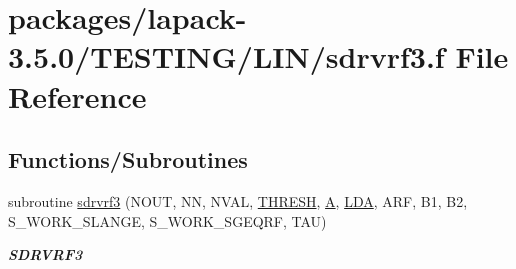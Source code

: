 \hypertarget{sdrvrf3_8f}{}\section{packages/lapack-\/3.5.0/\+T\+E\+S\+T\+I\+N\+G/\+L\+I\+N/sdrvrf3.f File Reference}
\label{sdrvrf3_8f}
\subsection*{Functions/\+Subroutines}
\begin{DoxyCompactItemize}
\item 
subroutine \hyperlink{group__single__lin_ga9a8604f18892afb24a856de008ea378f}{sdrvrf3} (N\+O\+U\+T, N\+N, N\+V\+A\+L, \hyperlink{zlaqgs_8c_a0656018abfc9fa2821827415f5d5ea57}{T\+H\+R\+E\+S\+H}, \hyperlink{classA}{A}, \hyperlink{example__user_8c_ae946da542ce0db94dced19b2ecefd1aa}{L\+D\+A}, A\+R\+F, B1, B2, S\+\_\+\+W\+O\+R\+K\+\_\+\+S\+L\+A\+N\+G\+E, S\+\_\+\+W\+O\+R\+K\+\_\+\+S\+G\+E\+Q\+R\+F, T\+A\+U)
\begin{DoxyCompactList}\small\item\em {\bfseries S\+D\+R\+V\+R\+F3} \end{DoxyCompactList}\end{DoxyCompactItemize}
